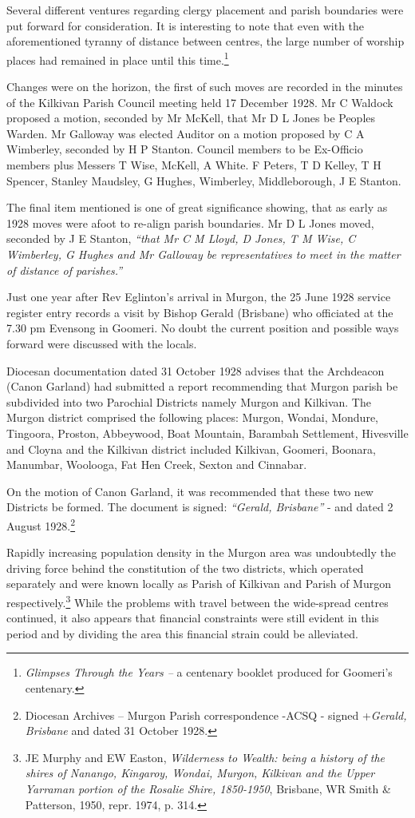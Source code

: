 Several different ventures regarding clergy placement and parish boundaries were put forward for consideration. It is interesting to note that even with the aforementioned tyranny of distance between centres, the large number of worship places had remained in place until this time.\footnote{\emph{Glimpses Through the Years --} a centenary booklet produced for Goomeri's centenary.}

Changes were on the horizon, the first of such moves are recorded in the minutes of the Kilkivan Parish Council meeting held 17 December 1928. Mr C Waldock proposed a motion, seconded by Mr McKell, that Mr D L Jones be Peoples Warden. Mr Galloway was elected Auditor on a motion proposed by C A Wimberley, seconded by H P Stanton. Council members to be Ex-Officio members plus Messers T Wise, McKell, A White. F Peters, T D Kelley, T H Spencer, Stanley Maudsley, G Hughes, Wimberley, Middleborough, J E Stanton.

The final item mentioned is one of great significance showing, that as early as 1928 moves were afoot to re-align parish boundaries. Mr D L Jones moved, seconded by J E Stanton, \emph{``that Mr C M Lloyd, D Jones, T M Wise, C Wimberley, G Hughes and Mr Galloway be representatives to meet in the matter of distance of parishes.''}

Just one year after Rev Eglinton's arrival in Murgon, the 25 June 1928 service register entry records a visit by Bishop Gerald (Brisbane) who officiated at the 7.30 pm Evensong in Goomeri. No doubt the current position and possible ways forward were discussed with the locals.

Diocesan documentation dated 31 October 1928 advises that the Archdeacon (Canon Garland) had submitted a report recommending that Murgon parish be subdivided into two Parochial Districts namely Murgon and Kilkivan. The Murgon district comprised the following places: Murgon, Wondai, Mondure, Tingoora, Proston, Abbeywood, Boat Mountain, Barambah Settlement, Hivesville and Cloyna and the Kilkivan district included Kilkivan, Goomeri, Boonara, Manumbar, Woolooga, Fat Hen Creek, Sexton and Cinnabar.

On the motion of Canon Garland, it was recommended that these two new Districts be formed. The document is signed: \emph{``Gerald, Brisbane''} - and dated 2 August 1928.\footnote{Diocesan Archives -- Murgon Parish correspondence -ACSQ - signed +\emph{Gerald, Brisbane} and dated 31 October 1928.}

Rapidly increasing population density in the Murgon area was undoubtedly the driving force behind the constitution of the two districts, which operated separately and were known locally as Parish of Kilkivan and Parish of Murgon respectively.\footnote{JE Murphy and EW Easton, \emph{Wilderness to Wealth: being a history of the shires of Nanango, Kingaroy, Wondai, Murgon, Kilkivan and the Upper Yarraman portion of the Rosalie Shire, 1850-1950}, Brisbane, WR Smith \& Patterson, 1950, repr. 1974, p. 314.} While the problems with travel between the wide-spread centres continued, it also appears that financial constraints were still evident in this period and by dividing the area this financial strain could be alleviated.

